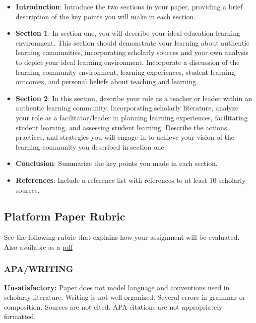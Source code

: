 \documentclass[
]{book}
\providecommand{\tightlist}{%
  \setlength{\itemsep}{0pt}\setlength{\parskip}{0pt}}
\begin{document}
\begin{assessment}
\begin{itemize}
\tightlist
\item
  \textbf{Introduction}: Introduce the two sections in your paper,
  providing a brief description of the key points you will make in each
  section.
\item
  \textbf{Section 1}: In section one, you will describe your ideal
  education learning environment. This section should demonstrate your
  learning about authentic learning communities, incorporating scholarly
  sources and your own analysis to depict your ideal learning
  environment. Incorporate a discussion of the learning community
  environment, learning experiences, student learning outcomes, and
  personal beliefs about teaching and learning.
\item
  \textbf{Section 2}: In this section, describe your role as a teacher
  or leader within an authentic learning community. Incorporating
  scholarly literature, analyze your role as a facilitator/leader in
  planning learning experiences, facilitating student learning, and
  assessing student learning. Describe the actions, practices, and
  strategies you will engage in to achieve your vision of the learning
  community you described in section one.
\item
  \textbf{Conclusion}: Summarize the key points you made in each
  section.
\item
  \textbf{References}: Include a reference list with references to at
  least 10 scholarly sources.
\end{itemize}
\end{assessment}

\hypertarget{platform-paper-rubric}{%
\subsection*{Platform Paper Rubric}\label{platform-paper-rubric}}

See the following rubric that explains how your assignment will be evaluated. Also available as a \href{assets/assessment/Platform-Paper-RUBRIC.pdf}{pdf}

\hypertarget{apawriting-1}{%
\subsubsection*{APA/WRITING}\label{apawriting-1}}

\textbf{Unsatisfactory:} Paper does not model language and conventions used in scholarly literature. Writing is not well-organized. Several errors in grammar or composition. Sources are not cited. APA citations are not appropriately formatted.
\end{document}
